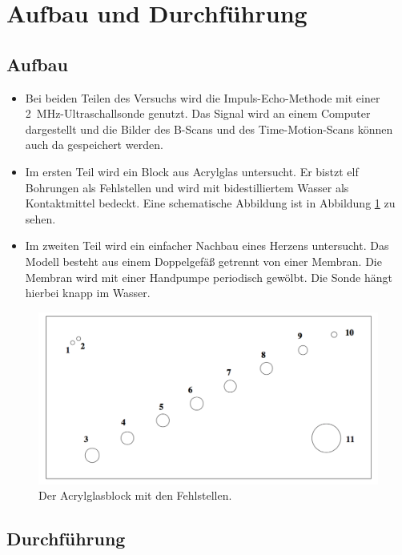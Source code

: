 \section{Aufbau und Durchführung}
\label{sec:Durchführung}

\subsection{Aufbau}

\begin{itemize}
  \item Bei beiden Teilen des Versuchs wird die Impuls-Echo-Methode mit einer
    \SI{2}{\mega\hertz}-Ultraschallsonde genutzt. Das Signal wird an einem Computer dargestellt und
    die Bilder des B-Scans und des Time-Motion-Scans können auch da gespeichert
    werden.
  \item Im ersten Teil wird ein Block aus Acrylglas untersucht. Er bistzt
    elf Bohrungen als Fehlstellen und wird mit bidestilliertem Wasser als
    Kontaktmittel bedeckt. Eine schematische Abbildung ist in Abbildung
    \ref{fig:acrylblock} zu sehen.
  \item Im zweiten Teil wird ein einfacher Nachbau eines Herzens untersucht.
    Das Modell besteht aus einem Doppelgefäß getrennt von einer Membran. Die
    Membran wird mit einer Handpumpe periodisch gewölbt. Die Sonde hängt hierbei
    knapp im Wasser.
\end{itemize}

\begin{figure}
  \centering
  \includegraphics[width=\textwidth]{Pics/block.pdf}
  \caption{Der Acrylglasblock mit den Fehlstellen.\cite{anleitung}}
  \label{fig:acrylblock}
\end{figure}

\subsection{Durchführung}

